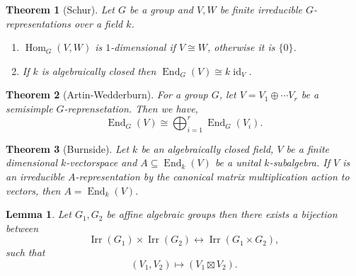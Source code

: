 \documentclass[10pt]{article}
\newtheorem{theorem}{Theorem} [section]
\newtheorem{lemma}{Lemma}[section]
\numberwithin{equation}{theorem}
\DeclareMathOperator{\End}{End}
\DeclareMathOperator{\Irr}{Irr}
\DeclareMathOperator{\Hom}{Hom}
\DeclareMathOperator{\id}{id}
\begin{document}
\begin{theorem}[Schur]
  \label{theorem_schur_lemma}
  Let $G$ be a group and $V,W$ be finite irreducible $G$-representations over a field $k$. 
  \begin{enumerate}
    \item $\Hom_G(V,W)$ is $1$-dimensional if $V\cong W$, otherwise it is $\{0\}$.
    \item If $k$ is algebraically closed then $\End_G(V)\cong k\id_V$.
  \end{enumerate}
\end{theorem}
\begin{theorem}[Artin-Wedderburn]
  \label{theorem_artin_wedderburn}
  For a group $G$, let $V=V_1\oplus\cdots V_r$ be a semisimple $G$-reprensetation. Then we have,
  \begin{equation*}
    \End_G(V)\cong\bigoplus_{i=1}^r \End_G(V_i).
  \end{equation*}
\end{theorem}
\begin{theorem}[Burnside]
  \label{theorem_burnside}
  Let $k$ be an algebraically closed field, $V$ be a finite dimensional $k$-vectorspace and $A\subseteq\End_k(V)$ be a unital $k$-subalgebra.
  If $V$ is an irreducible $A$-representation by the canonical matrix multiplication action to vectors, then $A=\End_k(V)$.
\end{theorem}
\begin{lemma}
  Let $G_1,G_2$ be affine algebraic groups then there exists a bijection between 
  \begin{equation*}
    \Irr(G_1)\times \Irr(G_2)\leftrightarrow\Irr(G_1\times G_2),
  \end{equation*} 
  such that 
  \begin{equation*}
    (V_1,V_2)\mapsto(V_1\boxtimes V_2).
  \end{equation*}
  \label{irreducible_representation_bijection}
\end{lemma}
\end{document}
